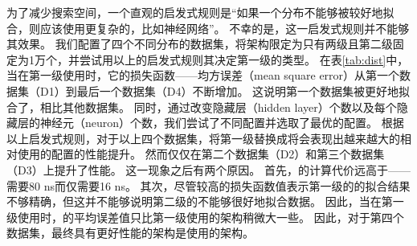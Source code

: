 为了减少搜索空间，一个直观的启发式规则是``如果一个分布不能够被{\lr}较好地拟合，则应该使用更复杂的{\model}，比如神经网络''。
不幸的是，这一启发式规则并不能够其效果。
我们配置了四个不同分布的数据集，将{\li}架构限定为只有两级且第二级固定为1万个{\lr}，并尝试用以上的启发式规则其决定第一级的{\model}类型。
在表\ref{tab:dist}中，当在第一级使用{\lr}时，它的损失函数{------}均方误差（mean square error）从第一个数据集（D1）到最后一个数据集（D4）不断增加。
这说明第一个数据集被{\lr}更好地拟合了，相比其他数据集。
同时，通过改变隐藏层（hidden layer）个数以及每个隐藏层的神经元（neuron）个数，我们尝试了不同{\nn}配置并选取了最优的{\nn}配置。
根据以上启发式规则，对于以上四个数据集，将第一级{\model}替换成{\nn}将会表现出越来越大的相对使用{\lr}的{\li}配置的性能提升。
然而{\nn}仅仅在第二个数据集（D2）和第三个数据集（D3）上提升了性能。
这一现象之后有两个原因。
首先，{\nn}的计算代价远高于{\lr}{------}{\nn}需要80 ns而{\lr}仅需要16 ns。
其次，尽管较高的损失函数值表示第一级的{\lr}的拟合结果不够精确，但这并不能够说明第二级的{\model}不能够很好地拟合数据。
因此，当在第一级使用{\lr}时，{\model}的平均误差值只比第一级使用{\nn}的架构稍微大一些。
因此，对于第四个数据集，最终具有更好性能的架构是使用{\lr}的架构。


